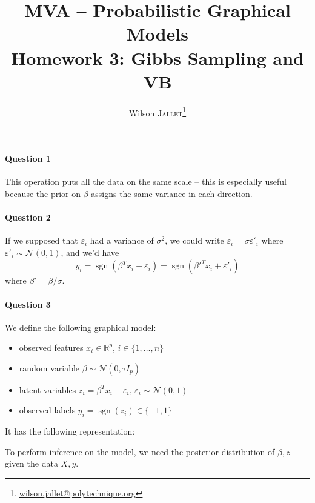 \documentclass[11pt]{article}
\title{
	MVA -- Probabilistic Graphical Models\\
	{\color{NavyBlue}\sffamily Homework 3: Gibbs Sampling and VB}
}
\author{
	Wilson \textsc{Jallet}\thanks{\url{wilson.jallet@polytechnique.org}}}
\newcommand\RR{\mathbb{R}}
\renewcommand{\epsilon}{\varepsilon}
\DeclareMathOperator{\sgn}{\mathrm{sgn}}
\newcommand{\calN}{\mathcal{N}}
\begin{document}
\maketitle


\paragraph{Question 1}
This operation puts all the data on the same scale -- this is especially useful because the prior on $\beta$ assigns the same variance in each direction.


\paragraph{Question 2}
If we supposed that $\epsilon_i$ had a variance of $\sigma^2$, we could write $\epsilon_i = \sigma \epsilon'_i$ where $\epsilon'_i \sim \calN(0,1)$, and we'd have
\[
	y_i = \sgn(\beta^T x_i + \epsilon_i) =
	\sgn({\beta'}^T x_i + \epsilon'_i)
\]
where $\beta' = \beta/\sigma$.


\paragraph{Question 3}
We define the following graphical model:
\begin{itemize}
	\item observed features $x_i \in \RR^p$, $i\in\{1,\ldots,n\}$
	\item random variable $\beta\sim \calN(0, \tau I_p)$
	\item latent variables $z_i = \beta^Tx_i + \epsilon_i$, $\epsilon_i \sim \calN(0,1)$
	\item observed labels $y_i = \sgn(z_i) \in \{-1,1\}$
\end{itemize}
It has the following representation:
\begin{figure}[h]
	\centering
\end{figure}

To perform inference on the model, we need the posterior distribution of $\beta, z$ given the data $X,y$.
\end{document}
